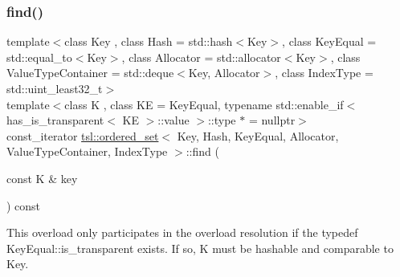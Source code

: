 \subsubsection{\texorpdfstring{find()}{find()}\hspace{0.1cm}{\footnotesize\ttfamily [5/6]}}
{\footnotesize\ttfamily template$<$class Key , class Hash  = std\+::hash$<$\+Key$>$, class Key\+Equal  = std\+::equal\+\_\+to$<$\+Key$>$, class Allocator  = std\+::allocator$<$\+Key$>$, class Value\+Type\+Container  = std\+::deque$<$\+Key, Allocator$>$, class Index\+Type  = std\+::uint\+\_\+least32\+\_\+t$>$ \\
template$<$class K , class KE  = Key\+Equal, typename std\+::enable\+\_\+if$<$ has\+\_\+is\+\_\+transparent$<$ K\+E $>$\+::value $>$\+::type $\ast$  = nullptr$>$ \\
const\+\_\+iterator \mbox{\hyperlink{classtsl_1_1ordered__set}{tsl\+::ordered\+\_\+set}}$<$ Key, Hash, Key\+Equal, Allocator, Value\+Type\+Container, Index\+Type $>$\+::find (\begin{DoxyParamCaption}\item[{const K \&}]{key }\end{DoxyParamCaption}) const\hspace{0.3cm}{\ttfamily [inline]}}





This overload only participates in the overload resolution if the typedef Key\+Equal\+::is\+\_\+transparent exists. If so, K must be hashable and comparable to Key. \mbox{\label{classtsl_1_1ordered__set_a9b56494c36c62b257971a5c89ce43ace}} 
